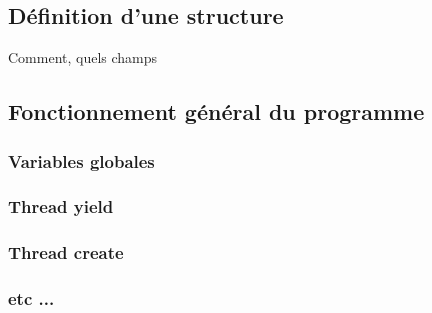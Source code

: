 \subsection{Définition d'une structure}
Comment, quels champs 

\subsection{Fonctionnement général du programme}
\subsubsection{Variables globales}
\subsubsection{Thread yield}
\subsubsection{Thread create}
\subsubsection{etc ...}
